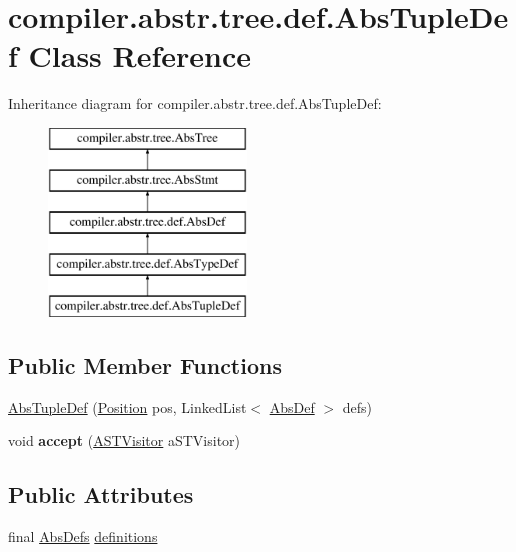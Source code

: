 \hypertarget{classcompiler_1_1abstr_1_1tree_1_1def_1_1_abs_tuple_def}{}\section{compiler.\+abstr.\+tree.\+def.\+Abs\+Tuple\+Def Class Reference}
\label{classcompiler_1_1abstr_1_1tree_1_1def_1_1_abs_tuple_def}
Inheritance diagram for compiler.\+abstr.\+tree.\+def.\+Abs\+Tuple\+Def\+:\begin{figure}[H]
\begin{center}
\leavevmode
\includegraphics[height=5.000000cm]{classcompiler_1_1abstr_1_1tree_1_1def_1_1_abs_tuple_def}
\end{center}
\end{figure}
\subsection*{Public Member Functions}
\begin{DoxyCompactItemize}
\item 
\hyperlink{classcompiler_1_1abstr_1_1tree_1_1def_1_1_abs_tuple_def_a6d11bf4078808721e03332c9a0ec8272}{Abs\+Tuple\+Def} (\hyperlink{classcompiler_1_1_position}{Position} pos, Linked\+List$<$ \hyperlink{classcompiler_1_1abstr_1_1tree_1_1def_1_1_abs_def}{Abs\+Def} $>$ defs)
\item 
\mbox{\label{classcompiler_1_1abstr_1_1tree_1_1def_1_1_abs_tuple_def_af6089a2fce7fb394ab11ead2c2e893cc}} 
void {\bfseries accept} (\hyperlink{interfacecompiler_1_1abstr_1_1_a_s_t_visitor}{A\+S\+T\+Visitor} a\+S\+T\+Visitor)
\end{DoxyCompactItemize}
\subsection*{Public Attributes}
\begin{DoxyCompactItemize}
\item 
final \hyperlink{classcompiler_1_1abstr_1_1tree_1_1_abs_defs}{Abs\+Defs} \hyperlink{classcompiler_1_1abstr_1_1tree_1_1def_1_1_abs_tuple_def_a7c764c8a266ea4b139b64f59377a5082}{definitions}
\end{DoxyCompactItemize}
